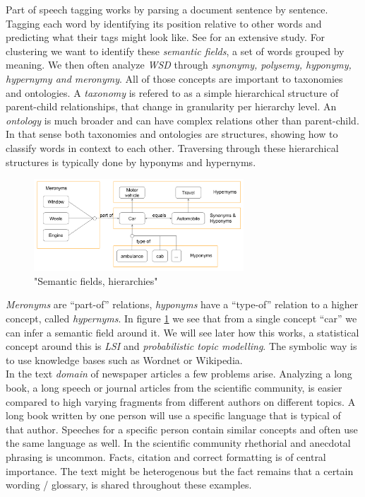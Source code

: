   Part of speech tagging works by parsing a document sentence by sentence. Tagging each word by identifying its position relative to other words and predicting what their tags might look like. See \cite{Nothing} for an extensive study.
  For clustering we want to identify these \emph{semantic fields}, a set of words grouped by meaning. We then often analyze \emph{WSD} through \emph{synonymy, polysemy, hyponymy, hypernymy and meronymy}. All of those concepts are important to taxonomies and ontologies. A \emph{taxonomy} is refered to as a simple hierarchical structure of parent-child relationships, that change in granularity per hierarchy level. An \emph{ontology} is much broader and can have complex relations other than parent-child. In that sense both taxonomies and ontologies are structures, showing how to classify words in context to each other. Traversing through these hierarchical structures is typically done by hyponyms and hypernyms. 

    \begin{figure}[h!]
      \centering
        \includegraphics[width=0.7\textwidth]{wsd_analysis.png}
        \caption{"Semantic fields, hierarchies"}
        \label{wsd_analysis}
    \end{figure} 

  \emph{Meronyms} are ``part-of'' relations, \emph{hyponyms} have a ``type-of'' relation to a higher concept, called \emph{hypernyms}. In figure \ref{wsd_analysis} we see that from a single concept ``car'' we can infer a semantic field around it. We will see later how this works, a statistical concept around this is \emph{LSI} and \emph{probabilistic topic modelling}. The symbolic way is to use knowledge bases such as Wordnet or Wikipedia.\\

  In the text \emph{domain} of newspaper articles a few problems arise. Analyzing a long book, a long speech or journal articles from the scientific community, is easier compared to high varying fragments from different authors on different topics. A long book written by one person will use a specific language that is typical of that author. Speeches for a specific person contain similar concepts and often use the same language as well. In the scientific community rhethorial and anecdotal phrasing is uncommon. Facts, citation and correct formatting is of central importance. The text might be heterogenous but the fact remains that a certain wording / glossary, is shared throughout these examples.\\

